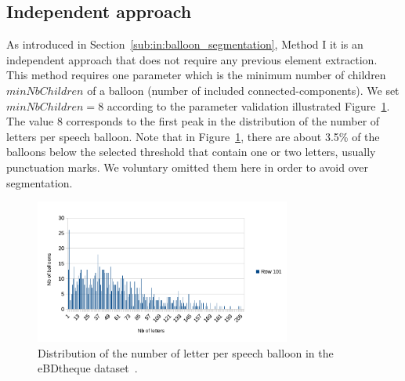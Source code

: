 

\subsection{Independent approach} %

As introduced in Section~\ref{sub:in:balloon_segmentation}, Method I it is an independent approach that does not require any previous element extraction.
This method requires one parameter which is the minimum number of children $minNbChildren$ of a balloon (number of included connected-components).
We set $minNbChildren=8$ according to the parameter validation illustrated Figure~\ref{fig:ex:min_number_children_validation}.
The value $8$ corresponds to the first peak in the distribution of the number of letters per speech balloon.
Note that in Figure~\ref{fig:ex:min_number_children_validation}, there are about 3.5\% of the balloons below the selected threshold that contain one or two letters, usually punctuation marks.
We voluntary omitted them here in order to avoid over segmentation.%

    \begin{figure}[h]%
      \centering
      \includegraphics[trim= 10px 0px 60px 0px, clip, width=0.75\textwidth]{number_of_letter_per_balloon.pdf}
      \caption[Distribution of the number of letter per speech balloon]{Distribution of the number of letter per speech balloon in the eBDtheque dataset~\cite{Guerin2013}.
      }
      \label{fig:ex:min_number_children_validation}
    \end{figure}  

